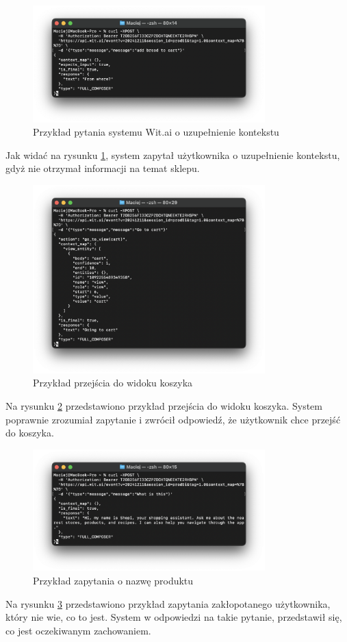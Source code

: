 \begin{figure}[H]
    \centering
    \includegraphics[width=0.8\textwidth]{images/witai_context_example.png}
    \caption{Przykład pytania systemu Wit.ai o uzupełnienie kontekstu}
    \label{fig:witai_context_example}
\end{figure}

Jak widać na rysunku \ref{fig:witai_context_example}, system zapytał użytkownika o uzupełnienie kontekstu, gdyż nie otrzymał informacji na temat sklepu.

\begin{figure}[H]
    \centering
    \includegraphics[width=0.8\textwidth]{images/witai_go_to_cart.png}
    \caption{Przykład przejścia do widoku koszyka}
    \label{fig:witai_cart_example}
\end{figure}

Na rysunku \ref{fig:witai_cart_example} przedstawiono przykład przejścia do widoku koszyka. System poprawnie zrozumiał zapytanie i zwrócił odpowiedź, że użytkownik chce przejść do koszyka.

\begin{figure}
    \centering
    \includegraphics[width=0.8\textwidth]{images/witai_what_is_this.png}
    \caption{Przykład zapytania o nazwę produktu}
    \label{fig:witai_what_is_this}
\end{figure}

Na rysunku \ref{fig:witai_what_is_this} przedstawiono przykład zapytania zakłopotanego użytkownika, który nie wie, co to jest. System w odpowiedzi na takie pytanie, przedstawił się, co jest oczekiwanym zachowaniem.
